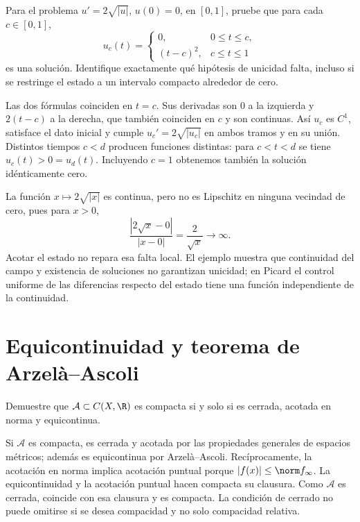 \begin{ejercicio}\label{ej:ampl-picard-5}
Para el problema $u'=2\sqrt{|u|}$, $u(0)=0$, en $[0,1]$, pruebe que para cada $c\in[0,1]$,
\[
 u_c(t)=\begin{cases}0,&0\le t\le c,\\(t-c)^2,&c\le t\le1\end{cases}
\]
es una solución. Identifique exactamente qué hipótesis de unicidad falta, incluso si se restringe el estado a un intervalo compacto alrededor de cero.
\end{ejercicio}
\begin{solucion}
Las dos fórmulas coinciden en $t=c$. Sus derivadas son $0$ a la izquierda y $2(t-c)$ a la derecha, que también coinciden en $c$ y son continuas. Así $u_c$ es $C^1$, satisface el dato inicial y cumple $u_c'=2\sqrt{|u_c|}$ en ambos tramos y en su unión. Distintos tiempos $c<d$ producen funciones distintas: para $c<t<d$ se tiene $u_c(t)>0=u_d(t)$. Incluyendo $c=1$ obtenemos también la solución idénticamente cero.

La función $x\mapsto2\sqrt{|x|}$ es continua, pero no es Lipschitz en ninguna vecindad de cero, pues para $x>0$,
\[
 \frac{|2\sqrt{x}-0|}{|x-0|}=\frac2{\sqrt{x}}\longrightarrow\infty.
\]
Acotar el estado no repara esa falta local. El ejemplo muestra que continuidad del campo y existencia de soluciones no garantizan unicidad; en Picard el control uniforme de las diferencias respecto del estado tiene una función independiente de la continuidad.
\end{solucion}

\chapter{Equicontinuidad y teorema de Arzelà--Ascoli}

\begin{ejercicio}\label{ej:lectura-27-1}
Demuestre que $\mathcal A\subset C(X,\R)$ es compacta si y solo si es cerrada, acotada en norma y equicontinua.
\end{ejercicio}
\begin{solucion}
Si $\mathcal A$ es compacta, es cerrada y acotada por las propiedades generales de espacios métricos; además es equicontinua por Arzelà--Ascoli. Recíprocamente, la acotación en norma implica acotación puntual porque $|f(x)|\le\norm f_\infty$. La equicontinuidad y la acotación puntual hacen compacta su clausura. Como $\mathcal A$ es cerrada, coincide con esa clausura y es compacta. La condición de cerrado no puede omitirse si se desea compacidad y no solo compacidad relativa.
\end{solucion}

